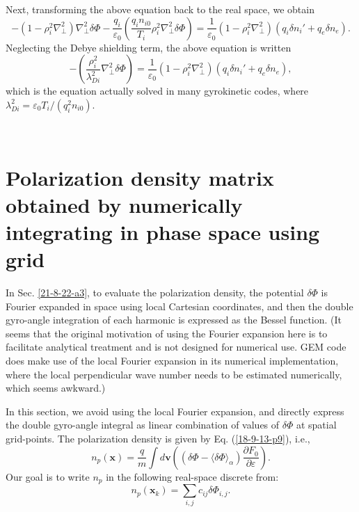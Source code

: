 \documentclass{article}
\begin{document}
Next, transforming the above equation back to the real space, we obtain
\begin{equation}
  - (1 - \rho_i^2 \nabla_{\perp}^2) \nabla_{\perp}^2 \delta \Phi -
  \frac{q_i}{\varepsilon_0} \left( \frac{q_i n_{i 0}}{T_i} \rho_i^2
  \nabla_{\perp}^2 \delta \Phi \right) = \frac{1}{\varepsilon_0} (1 - \rho_i^2
  \nabla_{\perp}^2) (q_i \delta n_i' + q_e \delta n_e) .
\end{equation}
Neglecting the Debye shielding term, the above equation is written
\begin{equation}
  - \left( \frac{\rho_i^2}{\lambda_{D i}^2} \nabla_{\perp}^2 \delta \Phi
  \right) = \frac{1}{\varepsilon_0} (1 - \rho_i^2 \nabla_{\perp}^2) (q_i
  \delta n_i' + q_e \delta n_e),
\end{equation}
which is the equation actually solved in many gyrokinetic codes, where
$\lambda_{D i}^2 = \varepsilon_0 T_i / (q_i^2 n_{i 0})$.

\

\section{Polarization density matrix obtained by numerically integrating in
phase space using grid}

In Sec. \ref{21-8-22-a3}, to evaluate the polarization density, the potential
$\delta \Phi$ is Fourier expanded in space using local Cartesian coordinates,
and then the double gyro-angle integration of each harmonic is expressed as
the Bessel function. (It seems that the original motivation of using the
Fourier expansion here is to facilitate analytical treatment and is not
designed for numerical use. GEM code does make use of the local Fourier
expansion in its numerical implementation, where the local perpendicular wave
number needs to be estimated numerically, which seems awkward.)

In this section, we avoid using the local Fourier expansion, and directly
express the double gyro-angle integral as linear combination of values of
$\delta \Phi$ at spatial grid-points. The polarization density is given by Eq.
(\ref{18-9-13-p9}), i.e.,
\begin{equation}
  n_p (\mathbf{x}) = \frac{q}{m} \int d\mathbf{v} \left( (\delta \Phi -
  \langle \delta \Phi \rangle_{\alpha}) \frac{\partial F_0}{\partial
  \varepsilon} \right) .
\end{equation}
Our goal is to write $n_p$ in the following real-space discrete from:
\begin{equation}
  n_p (\mathbf{x}_k) = \sum_{i, j} c_{i j} \delta \Phi_{i, j} .
\end{equation}
\end{document}
